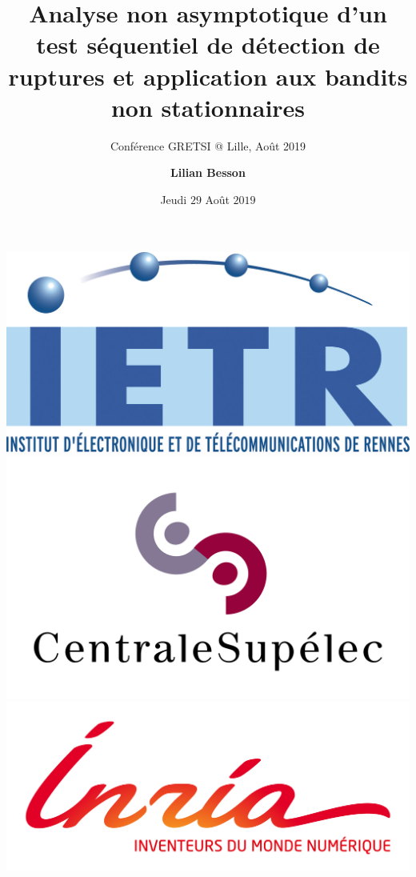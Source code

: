 \documentclass[11pt,french,ignorenonframetext,]{beamer}
\title[Test BGLR et bandits non-stationnaires]{Analyse non asymptotique d'un test séquentiel de détection de ruptures et application aux bandits non stationnaires}
\subtitle{Conférence GRETSI @ Lille, Août 2019}
\author[Lilian Besson]{\Large \textbf{Lilian Besson}}
\institute[]{{\large
  Doctorant}{\newline
  \newline Équipe SCEE, labo IETR, CentraleSupélec à Rennes
  \newline \& Équipe SequeL, labo CRIStAL, Inria à Lille}}
\date{Jeudi $29$ Août $2019$}
\begin{document}
\justifying

\begin{frame}[plain]
  \titlepage

  \begin{center}
    \includegraphics[height=0.15\textheight]{../common/LogoIETR.png}
    \includegraphics[height=0.17\textheight]{../common/LogoCS.png}
    \includegraphics[height=0.15\textheight]{../common/LogoInria.jpg}
  \end{center}

\end{frame}
\end{document}
